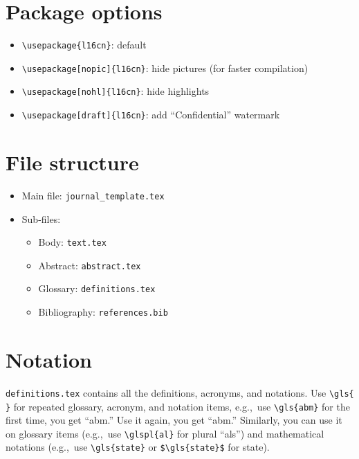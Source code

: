 
\section{Package options}
\begin{itemize}
	\item \verb|\usepackage{l16cn}|: default
	\item \verb|\usepackage[nopic]{l16cn}|: hide pictures (for faster compilation)
	\item \verb|\usepackage[nohl]{l16cn}|: hide highlights
	\item \verb|\usepackage[draft]{l16cn}|: add ``Confidential'' watermark
\end{itemize}

\section{File structure}
\begin{itemize}
	\item Main file: \verb|journal_template.tex|
	\item Sub-files:
	\begin{itemize}
		\item Body: \verb|text.tex|
		\item Abstract: \verb|abstract.tex|
		\item Glossary: \verb|definitions.tex|
		\item Bibliography: \verb|references.bib|
	\end{itemize}
\end{itemize}

\section{Notation}
\verb|definitions.tex| contains all the 
definitions, acronyms, and notations.
Use \verb|\gls{ }| for
repeated glossary, acronym, and notation items, 
e.g.,~use \verb|\gls{abm}| for the first time,
you get ``\gls{abm}.'' Use it again, you get ``\gls{abm}.''
Similarly, you can use it on glossary items 
(e.g.,~use \verb|\glspl{al}| for plural ``\glspl{al}'')
and mathematical notations 
(e.g.,~use \verb|\gls{state}| or \verb|$\gls{state}$|
for \gls{state}).

